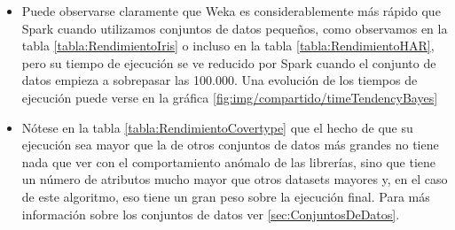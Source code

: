 \begin{itemize}
	\item Puede observarse claramente que Weka es considerablemente más rápido que Spark cuando utilizamos conjuntos de datos pequeños, como observamos en la tabla \ref{tabla:RendimientoIris} o incluso en la tabla \ref{tabla:RendimientoHAR}, pero su tiempo de ejecución se ve reducido por Spark cuando el conjunto de datos empieza a sobrepasar las 100.000. Una evolución de los tiempos de ejecución puede verse en la gráfica \ref{fig:img/compartido/timeTendencyBayes}

	\item Nótese en la tabla \ref{tabla:RendimientoCovertype} que el hecho de que su ejecución sea mayor que la de otros conjuntos de datos más grandes no tiene nada que ver con el comportamiento anómalo de las librerías, sino que tiene un número de atributos mucho mayor que otros datasets mayores y, en el caso de este algoritmo, eso tiene un gran peso sobre la ejecución final. Para más información sobre los conjuntos de datos ver \ref{sec:ConjuntosDeDatos}.
	

\end{itemize}
